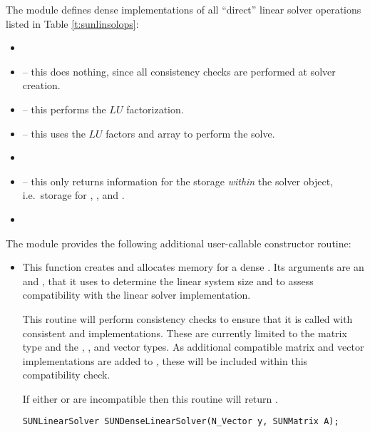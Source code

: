 
\noindent The {\sunlinsoldense} module defines dense implementations of all
``direct'' linear solver operations listed in
Table \ref{t:sunlinsolops}:
\begin{itemize}
\item {}
\item {} -- this does nothing, since all
  consistency checks are performed at solver creation.
\item {} -- this performs the $LU$ factorization.
\item {} -- this uses the $LU$ factors
  and  array to perform the solve.
\item {}
\item {} -- this only returns information for
  the storage \emph{within} the solver object, i.e.~storage
  for , , and .
\item {}
\end{itemize}
The module {\sunlinsoldense} provides the following additional
user-callable constructor routine: 
\begin{itemize}


\item {}

  This function creates and allocates memory for a dense .
  Its arguments are an {\nvector} and {\sunmatrix}, that it uses to
  determine the linear system size and to assess compatibility with
  the linear solver implementation.

  This routine will perform consistency checks to ensure that it is
  called with consistent {\nvector} and {\sunmatrix} implementations.
  These are currently limited to the {\sunmatdense} matrix type and
  the {\nvecs}, {\nvecopenmp}, and {\nvecpthreads} vector types.  As
  additional compatible matrix and vector implementations are added to
  {\sundials}, these will be included within this compatibility check.

  If either  or  are incompatible then this routine will
  return .

  \verb|SUNLinearSolver SUNDenseLinearSolver(N_Vector y, SUNMatrix A);|

\end{itemize}
